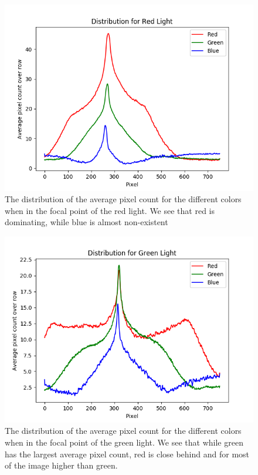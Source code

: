 \documentclass{emulateapj}
\begin{document}
\begin{figure}[H]
\centering
\includegraphics[scale=0.3]{redDist.png}
\caption{The distribution of the average pixel count for the different colors when in the focal point of the red light. We see that red is dominating, while blue is almost non-existent}
\label{img:green}
\end{figure}

\begin{figure}[H]
\centering
\includegraphics[scale=0.3]{greenDist.png}
\caption{The distribution of the average pixel count for the different colors when in the focal point of the green light. We see that while green has the largest average pixel count, red is close behind and for most of the image higher than green.}
\label{img:green}
\end{figure}
\end{document}
